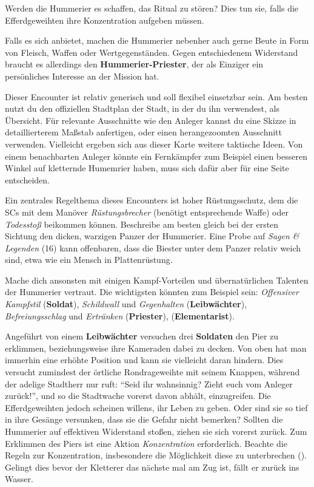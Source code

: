 Werden die Hummerier es schaffen, das Ritual zu stören? Dies tun sie, falls die Efferdgeweihten ihre Konzentration aufgeben müssen.

Falls es sich anbietet, machen die Hummerier nebenher auch gerne Beute in Form von Fleisch, Waffen oder Wertgegenständen. Gegen entschiedenem Widerstand braucht es allerdings den \textbf{Hummerier-Priester}, der als Einziger ein persönliches Interesse an der Mission hat.

Dieser Encounter ist relativ generisch und soll flexibel einsetzbar sein. Am besten nutzt du den offiziellen Stadtplan der Stadt, in der du ihn verwendest, als Übersicht.
Für relevante Ausschnitte wie den Anleger kannst du eine Skizze in detaillierterem Maßstab anfertigen, oder einen herangezoomten Ausschnitt verwenden.
Vielleicht ergeben sich aus dieser Karte weitere taktische Ideen. Von einem benachbarten Anleger könnte ein Fernkämpfer zum Beispiel einen besseren Winkel auf kletternde Humemrier haben, muss sich dafür aber für eine Seite entscheiden. 

Ein zentrales Regelthema dieses Encounters ist hoher Rüstungsschutz, dem die SCs mit dem Manöver \textit{Rüstungsbrecher} (benötigt entsprechende Waffe) oder \textit{Todesstoß} beikommen können.
Beschreibe am besten gleich bei der ersten Sichtung den dicken, warzigen Panzer der Hummerier. Eine Probe auf \textit{Sagen \& Legenden} (16) kann offenbaren, dass die Biester unter dem Panzer relativ weich sind, etwa wie ein Mensch in Plattenrüstung. 

Mache dich ansonsten mit einigen Kampf-Vorteilen und übernatürlichen Talenten der Hummerier vertraut. Die wichtigsten könnten zum Beispiel sein: \textit{Offensiver Kampfstil} (\textbf{Soldat}), \textit{Schildwall} und \textit{Gegenhalten} (\textbf{Leibwächter}), \textit{Befreiungsschlag} und \textit{Ertränken} (\textbf{Priester}),  (\textbf{Elementarist}). 

Angeführt von einem \textbf{Leibwächter} versuchen drei \textbf{Soldaten} den Pier zu erklimmen, beziehungsweise ihre Kameraden dabei zu decken. Von oben hat man immerhin eine erhöhte Position und kann sie vielleicht daran hindern.
Dies versucht zumindest der örtliche Rondrageweihte mit seinem Knappen, während der adelige Stadtherr nur ruft: \enquote{Seid ihr wahnsinnig? Zieht euch vom Anleger zurück!}, und so die Stadtwache vorerst davon abhält, einzugreifen.
Die Efferdgeweihten jedoch scheinen willens, ihr Leben zu geben.
Oder sind sie so tief in ihre Gesänge versunken, dass sie die Gefahr nicht bemerken?
Sollten die Hummerier auf effektiven Widerstand stoßen, ziehen sie sich vorerst zurück. 
\smallskip 
\newline 
{}
Zum Erklimmen des Piers ist eine Aktion \textit{Konzentration} erforderlich. Beachte die Regeln zur Konzentration, insbesondere die Möglichkeit diese zu unterbrechen ().
Gelingt dies bevor der Kletterer das nächste mal am Zug ist, fällt er zurück ins Wasser. 

